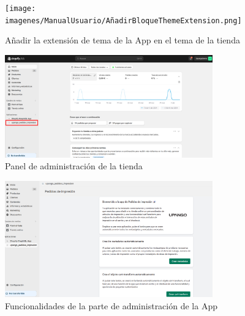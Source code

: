 \documentclass[12pt]{article}
\begin{document}
\begin{figure}[ht]
    \centering
    \texttt{[image: imagenes/ManualUsuario/AñadirBloqueThemeExtension.png]}
    \caption{\label{fig:ThemeAppExtension}Añadir la extensión de tema de la App en el tema de la tienda}
    \vspace{\fill}
\end{figure}

\begin{figure}[ht]
    \centering
    \includegraphics[width=0.8\textwidth]{imagenes/ManualUsuario/PaginaAdministracion.png}
    \caption{\label{fig:PanelAdministracion}Panel de administración de la tienda}
    \vspace{\fill}
\end{figure}

\begin{figure}[ht]
    \centering
    \includegraphics[width=0.8\textwidth]{imagenes/ManualUsuario/FuncionalidadPaginaAdministracion.png}
    \caption{\label{fig:FuncionalidadAdministracion}Funcionalidades de la parte de administración de la App}
    \vspace{\fill}
\end{figure}
\end{document}
